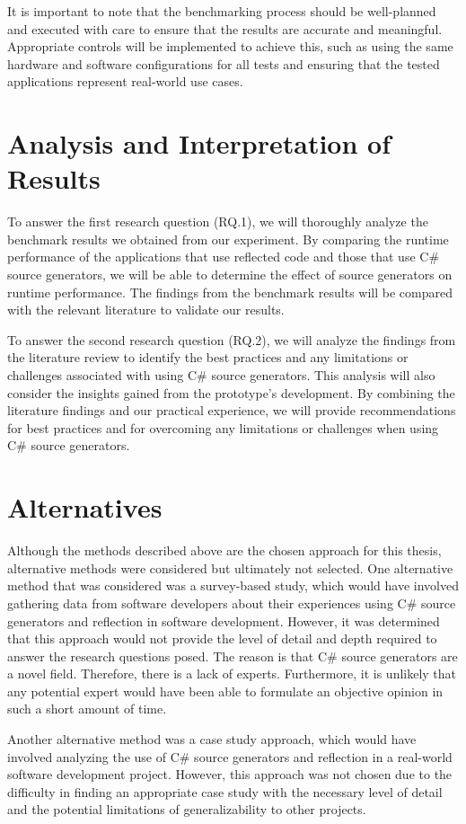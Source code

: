 It is important to note that the benchmarking process should be well-planned and executed with care to ensure that the results are accurate and meaningful. Appropriate controls will be implemented to achieve this, such as using the same hardware and software configurations for all tests and ensuring that the tested applications represent real-world use cases.


\section{Analysis and Interpretation of Results}

To answer the first research question (RQ.1), we will thoroughly analyze the benchmark results we obtained from our experiment. By comparing the runtime performance of the applications that use reflected code and those that use C\# source generators, we will be able to determine the effect of source generators on runtime performance. The findings from the benchmark results will be compared with the relevant literature to validate our results.

To answer the second research question (RQ.2), we will analyze the findings from the literature review to identify the best practices and any limitations or challenges associated with using C\# source generators. This analysis will also consider the insights gained from the prototype's development. By combining the literature findings and our practical experience, we will provide recommendations for best practices and for overcoming any limitations or challenges when using C\# source generators.


\section{Alternatives}

Although the methods described above are the chosen approach for this thesis, alternative methods were considered but ultimately not selected. One alternative method that was considered was a survey-based study, which would have involved gathering data from software developers about their experiences using C\# source generators and reflection in software development. However, it was determined that this approach would not provide the level of detail and depth required to answer the research questions posed. The reason is that C\# source generators are a novel field. Therefore, there is a lack of experts. Furthermore, it is unlikely that any potential expert would have been able to formulate an objective opinion in such a short amount of time.

Another alternative method was a case study approach, which would have involved analyzing the use of C\# source generators and reflection in a real-world software development project. However, this approach was not chosen due to the difficulty in finding an appropriate case study with the necessary level of detail and the potential limitations of generalizability to other projects.
